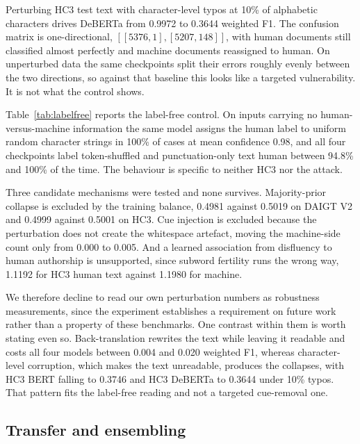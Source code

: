 Perturbing HC3 test text with character-level typos at 10\% of alphabetic characters drives DeBERTa from 0.9972 to 0.3644 weighted F1. The confusion matrix is one-directional, $[[5376, 1], [5207, 148]]$, with human documents still classified almost perfectly and machine documents reassigned to human. On unperturbed data the same checkpoints split their errors roughly evenly between the two directions, so against that baseline this looks like a targeted vulnerability. It is not what the control shows.

Table~\ref{tab:labelfree} reports the label-free control. On inputs carrying no human-versus-machine information the same model assigns the human label to uniform random character strings in 100\% of cases at mean confidence 0.98, and all four checkpoints label token-shuffled and punctuation-only text human between 94.8\% and 100\% of the time. The behaviour is specific to neither HC3 nor the attack.

Three candidate mechanisms were tested and none survives. Majority-prior collapse is excluded by the training balance, 0.4981 against 0.5019 on DAIGT V2 and 0.4999 against 0.5001 on HC3. Cue injection is excluded because the perturbation does not create the whitespace artefact, moving the machine-side count only from 0.000 to 0.005. And a learned association from disfluency to human authorship is unsupported, since subword fertility runs the wrong way, 1.1192 for HC3 human text against 1.1980 for machine.

We therefore decline to read our own perturbation numbers as robustness measurements, since the experiment establishes a requirement on future work rather than a property of these benchmarks. One contrast within them is worth stating even so. Back-translation rewrites the text while leaving it readable and costs all four models between 0.004 and 0.020 weighted F1, whereas character-level corruption, which makes the text unreadable, produces the collapses, with HC3 BERT falling to 0.3746 and HC3 DeBERTa to 0.3644 under 10\% typos. That pattern fits the label-free reading and not a targeted cue-removal one.

\subsection{Transfer and ensembling}

